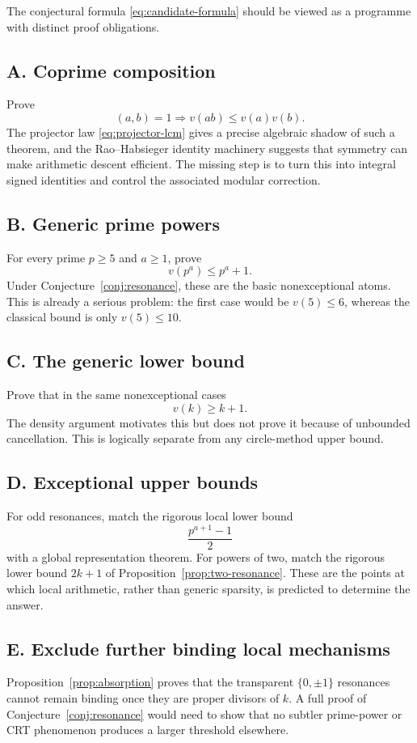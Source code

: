 \documentclass[../Axiomathic.tex]{subfiles}
\begin{document}
The conjectural formula \eqref{eq:candidate-formula} should be viewed as a programme with distinct proof obligations.

\subsection{A. Coprime composition}
Prove
\[
  (a,b)=1\Longrightarrow v(ab)\le v(a)v(b).
\]
The projector law \eqref{eq:projector-lcm} gives a precise algebraic shadow of such a theorem, and the Rao--Habsieger identity machinery suggests that symmetry can make arithmetic descent efficient.  The missing step is to turn this into integral signed identities and control the associated modular correction.

\subsection{B. Generic prime powers}
For every prime $p\ge5$ and $a\ge1$, prove
\[
  v(p^a)\le p^a+1.
\]
Under Conjecture~\ref{conj:resonance}, these are the basic nonexceptional atoms.  This is already a serious problem: the first case would be $v(5)\le6$, whereas the classical bound is only $v(5)\le10$.

\subsection{C. The generic lower bound}
Prove that in the same nonexceptional cases
\[
  v(k)\ge k+1.
\]
The density argument motivates this but does not prove it because of unbounded cancellation.  This is logically separate from any circle-method upper bound.

\subsection{D. Exceptional upper bounds}
For odd resonances, match the rigorous local lower bound
\[
  \frac{p^{a+1}-1}{2}
\]
with a global representation theorem.  For powers of two, match the rigorous lower bound $2k+1$ of Proposition~\ref{prop:two-resonance}.  These are the points at which local arithmetic, rather than generic sparsity, is predicted to determine the answer.

\subsection{E. Exclude further binding local mechanisms}
Proposition~\ref{prop:absorption} proves that the transparent $\{0,\pm1\}$ resonances cannot remain binding once they are proper divisors of $k$.  A full proof of Conjecture~\ref{conj:resonance} would need to show that no subtler prime-power or CRT phenomenon produces a larger threshold elsewhere.
\end{document}
